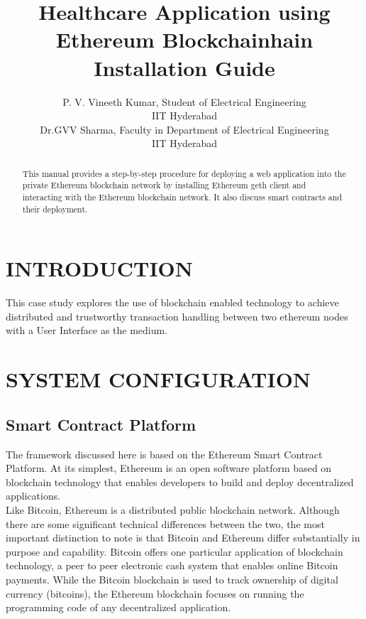 \documentclass[journal,12pt,twocolumn]{IEEEtran}
\title{\LARGE \bf
Healthcare Application using Ethereum Blockchainhain Installation Guide
}
\author{ \parbox{3 in}{\centering P. V. Vineeth Kumar,
         Student of Electrical Engineering\\
         IIT Hyderabad}
         \hspace*{ 0.5 in}
         \parbox{3 in}{ \centering Dr.GVV Sharma,
         Faculty in Department of Electrical Engineering \\
         IIT Hyderabad}
}
\begin{document}
\maketitle
\thispagestyle{empty}
\pagestyle{empty}


\begin{abstract}

This manual provides a step-by-step procedure for deploying a web application into the private Ethereum blockchain network by installing Ethereum geth client and interacting with the Ethereum blockchain network. It also discuss smart contracts and their deployment.
	
\end{abstract}


\section{INTRODUCTION}

This case study explores the use of blockchain enabled technology to achieve distributed and trustworthy transaction handling between two ethereum nodes with a User Interface  as the medium.

\section{SYSTEM CONFIGURATION}

\subsection{Smart Contract Platform}

The framework discussed here is based on the Ethereum Smart Contract Platform.
At its simplest, Ethereum is an open software platform based on blockchain technology that enables developers to build and deploy decentralized applications.\\
Like Bitcoin, Ethereum is a distributed public blockchain network. Although there are some significant technical differences between the two, the most important distinction to note is that Bitcoin and Ethereum differ substantially in purpose and capability. Bitcoin offers one particular application of blockchain technology, a peer to peer electronic cash system that enables online Bitcoin payments. While the Bitcoin blockchain is used to track ownership of digital currency (bitcoins), the Ethereum blockchain focuses on running the programming code of any decentralized application.
\end{document}
